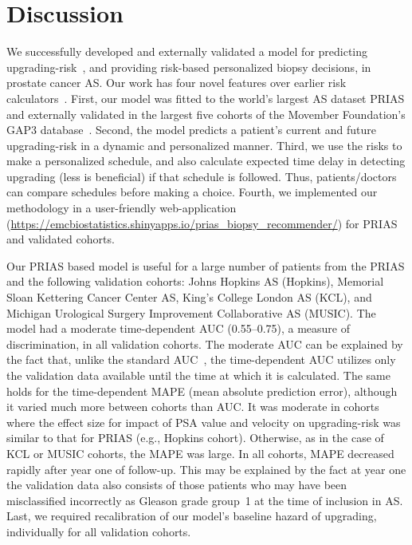\section{Discussion}
We successfully developed and externally validated a model for predicting upgrading-risk~\citep{bruinsma2017expert}, and providing risk-based personalized biopsy decisions, in prostate cancer AS.
Our work has four novel features over earlier risk calculators~\citep{coley2017prediction,ankerst2015precision}. First, our model was fitted to the world's largest AS dataset PRIAS and externally validated in the largest five cohorts of the Movember Foundation's GAP3 database~\citep{gap3_2018}. Second, the model predicts a patient's current and future upgrading-risk in a dynamic and personalized manner. Third, we use the risks to make a personalized schedule, and also calculate expected time delay in detecting upgrading (less is beneficial) if that schedule is followed. Thus, patients/doctors can compare schedules before making a choice. Fourth, we implemented our methodology in a user-friendly web-application (\url{https://emcbiostatistics.shinyapps.io/prias_biopsy_recommender/}) for PRIAS and validated cohorts.

Our PRIAS based model is useful for a large number of patients from the PRIAS and the following validation cohorts: Johns Hopkins AS (Hopkins), Memorial Sloan Kettering Cancer Center AS, King's College London AS (KCL), and Michigan Urological Surgery Improvement Collaborative AS (MUSIC). The model had a moderate time-dependent AUC (0.55--0.75), a measure of discrimination, in all validation cohorts. The moderate AUC can be explained by the fact that, unlike the standard AUC~\citep{steyerberg2010assessing}, the time-dependent AUC utilizes only the validation data available until the time at which it is calculated. The same holds for the time-dependent MAPE (mean absolute prediction error), although it varied much more between cohorts than AUC. It was moderate in cohorts where the effect size for impact of PSA value and velocity on upgrading-risk was similar to that for PRIAS (e.g., Hopkins cohort). Otherwise, as in the case of KCL or MUSIC cohorts, the MAPE was large. In all cohorts, MAPE decreased rapidly after year one of follow-up. This may be explained by the fact at year one the validation data also consists of those patients who may have been misclassified incorrectly as Gleason grade group~1 at the time of inclusion in AS. Last, we required recalibration of our model's baseline hazard of upgrading, individually for all validation cohorts.

